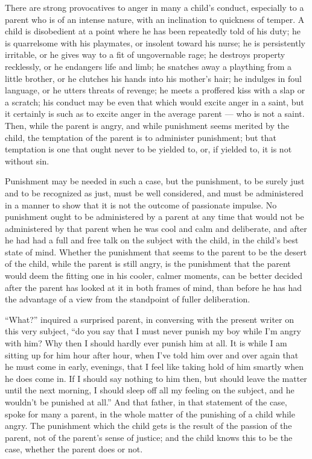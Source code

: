 \documentclass[
]{book}
\begin{document}
There are strong provocatives to anger in many a child's conduct, especially to a parent who is of an intense nature, with an inclination to quickness of temper. A child is disobedient at a point where he has been repeatedly told of his duty; he is quarrelsome with his playmates, or insolent toward his nurse; he is persistently irritable, or he gives way to a fit of ungovernable rage; he destroys property recklessly, or he endangers life and limb; he snatches away a plaything from a little brother, or he clutches his hands into his mother's hair; he indulges in foul language, or he utters threats of revenge; he meets a proffered kiss with a slap or a scratch; his conduct may be even that which would excite anger in a saint, but it certainly is such as to excite anger in the average parent --- who is not a saint. Then, while the parent is angry, and while punishment seems merited by the child, the temptation of the parent is to administer punishment; but that temptation is one that ought never to be yielded to, or, if yielded to, it is not without sin.

Punishment may be needed in such a case, but the punishment, to be surely just and to be recognized as just, must be well considered, and must be administered in a manner to show that it is not the outcome of passionate impulse. No punishment ought to be administered by a parent at any time that would not be administered by that parent when he was cool and calm and deliberate, and after he had had a full and free talk on the subject with the child, in the child's best state of mind. Whether the punishment that seems to the parent to be the desert of the child, while the parent is still angry, is the punishment that the parent would deem the fitting one in his cooler, calmer moments, can be better decided after the parent has looked at it in both frames of mind, than before he has had the advantage of a view from the standpoint of fuller deliberation.

``What?'' inquired a surprised parent, in conversing with the present writer on this very subject, ``do you say that I must never punish my boy while I'm angry with him? Why then I should hardly ever punish him at all. It is while I am sitting up for him hour after hour, when I've told him over and over again that he must come in early, evenings, that I feel like taking hold of him smartly when he does come in. If I should say nothing to him then, but should leave the matter until the next morning, I should sleep off all my feeling on the subject, and he wouldn't be punished at all.'' And that father, in that statement of the case, spoke for many a parent, in the whole matter of the punishing of a child while angry. The punishment which the child gets is the result of the passion of the parent, not of the parent's sense of justice; and the child knows this to be the case, whether the parent does or not.
\end{document}
